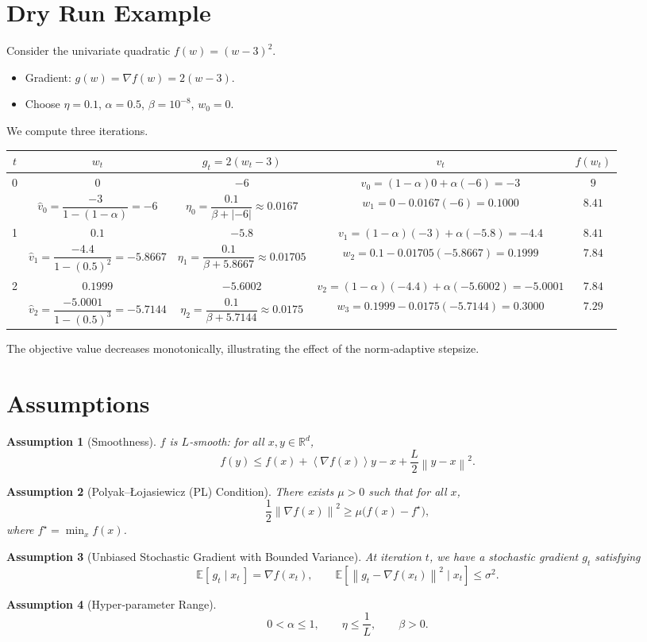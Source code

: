 \documentclass{article}
\newtheorem{assumption}{Assumption}
\newcommand{\E}{\mathbb{E}}
\newcommand{\norm}[1]{\left\lVert #1 \right\rVert}
\newcommand{\inner}[1]{\left\langle #1 \right\rangle}
\begin{document}
\section*{Dry Run Example}
Consider the univariate quadratic $f(w)=(w-3)^2$.
\begin{itemize}
    \item Gradient: $g(w)=\nabla f(w)=2(w-3)$.
    \item Choose $\eta=0.1$, $\alpha=0.5$, $\beta=10^{-8}$, $w_0=0$.
\end{itemize}
We compute three iterations.

\begin{center}
\begin{tabular}{c|c|c|c|c}
$t$ & $w_t$ & $g_t=2(w_t-3)$ & $v_t$ & $f(w_t)$\\\hline
0 & $0$ & $-6$ & $v_0=(1-\alpha)0+\alpha(-6)=-3$ &
$9$\\
 & $\hat v_0=\dfrac{-3}{1-(1-\alpha)}=-6$ &
 $\eta_0=\dfrac{0.1}{\beta+|{-6}|}\approx 0.0167$ &
 $w_1=0-0.0167(-6)=0.1000$ &
 $8.41$\\\hline
1 & $0.1$ & $-5.8$ & $v_1=(1-\alpha)(-3)+\alpha(-5.8)=-4.4$ &
 $8.41$\\
 & $\hat v_1=\dfrac{-4.4}{1-(0.5)^2}=-5.8667$ &
 $\eta_1=\dfrac{0.1}{\beta+5.8667}\approx0.01705$ &
 $w_2=0.1-0.01705(-5.8667)=0.1999$ &
 $7.84$\\\hline
2 & $0.1999$ & $-5.6002$ & $v_2=(1-\alpha)(-4.4)+\alpha(-5.6002)=-5.0001$ &
 $7.84$\\
 & $\hat v_2=\dfrac{-5.0001}{1-(0.5)^3}=-5.7144$ &
 $\eta_2=\dfrac{0.1}{\beta+5.7144}\approx0.0175$ &
 $w_3=0.1999-0.0175(-5.7144)=0.3000$ &
 $7.29$
\end{tabular}
\end{center}
The objective value decreases monotonically, illustrating the effect of the norm‑adaptive stepsize.

\newpage
\section*{Assumptions}
\begin{assumption}[Smoothness]\label{ass:smooth}
$f$ is $L$‑smooth: for all $x,y\in\mathbb{R}^d$,
\[
    f(y)\le f(x)+\inner{\nabla f(x)}{y-x}+\frac{L}{2}\norm{y-x}^2 .
\]
\end{assumption}
\begin{assumption}[Polyak–Łojasiewicz (PL) Condition]\label{ass:pl}
There exists $\mu>0$ such that for all $x$,
\[
    \frac{1}{2}\norm{\nabla f(x)}^2\ge\mu\bigl(f(x)-f^\star\bigr),
\]
where $f^\star=\min_x f(x)$.
\end{assumption}
\begin{assumption}[Unbiased Stochastic Gradient with Bounded Variance]\label{ass:sgd}
At iteration $t$, we have a stochastic gradient $g_t$ satisfying
\[
    \E\!\left[\,g_t\mid x_t\,\right]=\nabla f(x_t),\qquad
    \E\!\left[\norm{g_t-\nabla f(x_t)}^2\mid x_t\right]\le\sigma^2 .
\]
\end{assumption}
\begin{assumption}[Hyper‑parameter Range]\label{ass:hyper}
\[
    0<\alpha\le 1,\qquad \eta\le\frac{1}{L},\qquad \beta>0 .
\]
\end{assumption}
\end{document}
